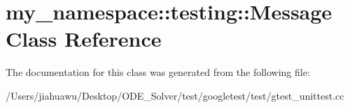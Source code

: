 \hypertarget{classmy__namespace_1_1testing_1_1_message}{}\section{my\+\_\+namespace\+:\+:testing\+:\+:Message Class Reference}
\label{classmy__namespace_1_1testing_1_1_message}


The documentation for this class was generated from the following file\+:\begin{DoxyCompactItemize}
\item 
/\+Users/jiahuawu/\+Desktop/\+O\+D\+E\+\_\+\+Solver/test/googletest/test/gtest\+\_\+unittest.\+cc\end{DoxyCompactItemize}
